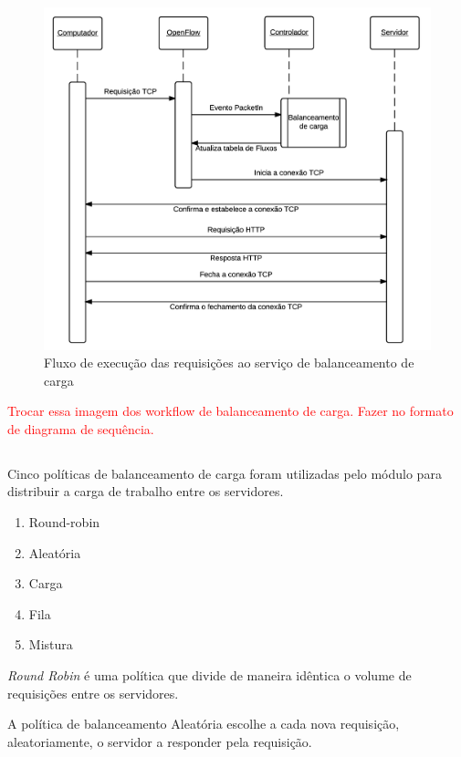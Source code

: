 \begin{figure}[htb!]
    \centering
    \includegraphics[width=\linewidth]{img/balancer-workflow}
    \caption{Fluxo de execução das requisições ao serviço de balanceamento 
    de carga}
    \label{fig:balancer-workflow}
\end{figure}

\textcolor{red}{Trocar essa imagem dos workflow de balanceamento de carga. 
Fazer no formato de diagrama de sequência.}

\subsection{}

Cinco políticas de balanceamento de carga foram utilizadas pelo módulo para 
distribuir a carga de trabalho entre os servidores.

\begin{enumerate}
    \item Round-robin
    \item Aleatória
    \item Carga
    \item Fila 
    \item Mistura
\end{enumerate}

\emph{Round Robin} é uma política que divide de maneira idêntica o volume de
requisições entre os servidores.

A política de balanceamento Aleatória escolhe a cada nova requisição, 
aleatoriamente, o servidor a responder pela requisição.

